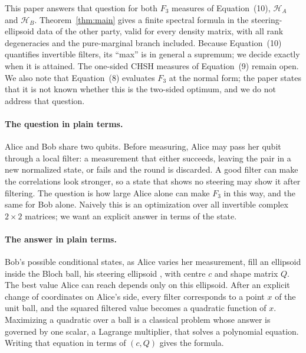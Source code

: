 \documentclass[11pt]{article}
\theoremstyle{remark}\newtheorem{remark}[theorem]{Remark}
\newcommand{\HF}{\mathcal H}
\begin{document}
This paper answers that question for both $F_3$ measures of Equation~(10),
$\HF_A$ and $\HF_B$. Theorem~\ref{thm:main} gives a finite spectral formula
in the steering-ellipsoid data of the other party, valid for every density
matrix, with all rank degeneracies and the pure-marginal branch included.
Because Equation~(10) quantifies invertible filters, its ``max'' is in
general a supremum; we decide exactly when it is attained. The one-sided
CHSH measures of Equation~(9) remain open. We also note that Equation~(8)
evaluates $F_3$ at the normal form; the paper states that it is not known
whether this is the two-sided optimum, and we do not address that question.

\paragraph{The question in plain terms.}
Alice and Bob share two qubits. Before measuring, Alice may pass her qubit
through a local filter: a measurement that either succeeds, leaving the pair
in a new normalized state, or fails and the round is discarded. A good
filter can make the correlations look stronger, so a state that shows no
steering may show it after filtering. The question is how large Alice alone
can make $F_3$ in this way, and the same for Bob alone. Naively this is an
optimization over all invertible complex $2\times2$ matrices; we want an
explicit answer in terms of the state.

\paragraph{The answer in plain terms.}
Bob's possible conditional states, as Alice varies her measurement, fill an
ellipsoid inside the Bloch ball, his steering ellipsoid
\cite{jevtic}, with centre $c$ and shape matrix $Q$. The best value Alice
can reach depends only on this ellipsoid. After an explicit change of
coordinates on Alice's side, every filter corresponds to a point $x$ of the
unit ball, and the squared filtered value becomes a quadratic function of
$x$. Maximizing a quadratic over a ball is a classical problem whose answer
is governed by one scalar, a Lagrange multiplier, that solves a polynomial
equation. Writing that equation in terms of $(c,Q)$ gives the formula.
\end{document}
